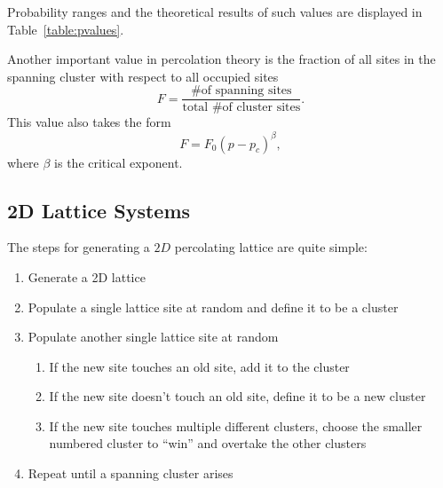 \documentclass[12pt]{article}
\begin{document}
Probability ranges and the theoretical results of such values are displayed in Table~\ref{table:pvalues}.
\begin{table}[!htb]
\end{table}

Another important value in percolation theory is the fraction of all sites in the spanning cluster with respect to all occupied sites
\begin{equation}
  \label{eq:fraction}
  F = \frac{\text{\# of spanning sites}}{\text{total \# of cluster sites}}.
  \end{equation}
This value also takes the form
\begin{equation}
  \label{eq:spanningfraction}
  F = F_0 \left(p - p_c\right)^\beta,
\end{equation}
where $\beta$ is the critical exponent.

\subsection{2D Lattice Systems}
\label{sec:lattice}

The steps for generating a $2D$ percolating lattice are quite simple:
\begin{enumerate}
  \label{code:percolatinglattice}
  \item Generate a 2D lattice
  \item Populate a single lattice site at random and define it to be a cluster
  \item Populate another single lattice site at random
  \begin{enumerate}
    \item If the new site touches an old site, add it to the cluster
    \item If the new site doesn't touch an old site, define it to be a new cluster
    \item If the new site touches multiple different clusters, choose the smaller numbered cluster to ``win'' and overtake the other clusters
  \end{enumerate}
  \item Repeat until a spanning cluster arises
\end{enumerate}
\end{document}
